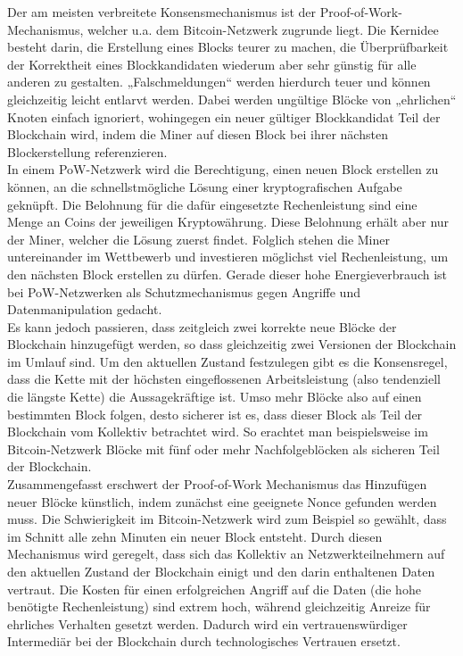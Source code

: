 Der am meisten verbreitete Konsensmechanismus ist der Proof-of-Work-Mechanismus, welcher u.a. dem Bitcoin-Netzwerk zugrunde liegt. Die Kernidee besteht darin, die Erstellung eines Blocks teurer zu machen, die Überprüfbarkeit der Korrektheit eines Blockkandidaten wiederum aber sehr günstig für alle anderen zu gestalten. „Falschmeldungen“ werden hierdurch teuer und können gleichzeitig leicht entlarvt werden. Dabei werden ungültige Blöcke von „ehrlichen“ Knoten einfach ignoriert, wohingegen ein neuer gültiger Blockkandidat Teil der Blockchain wird, indem die Miner auf diesen Block bei ihrer nächsten Blockerstellung referenzieren.\\
In einem PoW-Netzwerk wird die Berechtigung, einen neuen Block erstellen zu können, an die schnellstmögliche Lösung einer kryptografischen Aufgabe geknüpft. Die Belohnung für die dafür eingesetzte Rechenleistung sind eine Menge an Coins der jeweiligen Kryptowährung. Diese Belohnung erhält aber nur der Miner, welcher die Lösung zuerst findet. Folglich stehen die Miner untereinander im Wettbewerb und investieren möglichst viel Rechenleistung, um den nächsten Block erstellen zu dürfen.  Gerade dieser hohe Energieverbrauch ist bei PoW-Netzwerken als Schutzmechanismus gegen Angriffe und Datenmanipulation gedacht.\\
Es kann jedoch passieren, dass zeitgleich zwei korrekte neue Blöcke der Blockchain hinzugefügt werden, so dass gleichzeitig zwei Versionen der Blockchain im Umlauf sind. Um den aktuellen Zustand festzulegen gibt es die Konsensregel, dass die Kette mit der höchsten eingeflossenen Arbeitsleistung (also tendenziell die längste Kette) die Aussagekräftige ist. Umso mehr Blöcke also auf einen bestimmten Block folgen, desto sicherer ist es, dass dieser Block als Teil der Blockchain vom Kollektiv betrachtet wird. So erachtet man beispielsweise im Bitcoin-Netzwerk Blöcke mit fünf oder mehr Nachfolgeblöcken als sicheren Teil der Blockchain.\\
Zusammengefasst erschwert der Proof-of-Work Mechanismus das Hinzufügen neuer Blöcke künstlich, indem zunächst eine geeignete Nonce gefunden werden muss. Die Schwierigkeit im Bitcoin-Netzwerk wird zum Beispiel so gewählt, dass im Schnitt alle zehn Minuten ein neuer Block entsteht. Durch diesen Mechanismus wird geregelt, dass sich das Kollektiv an Netzwerkteilnehmern auf den aktuellen Zustand der Blockchain einigt und den darin enthaltenen Daten vertraut. Die Kosten für einen erfolgreichen Angriff auf die Daten (die hohe benötigte Rechenleistung) sind extrem hoch, während gleichzeitig Anreize für ehrliches Verhalten gesetzt werden. Dadurch wird ein vertrauenswürdiger Intermediär bei der Blockchain durch technologisches Vertrauen ersetzt.